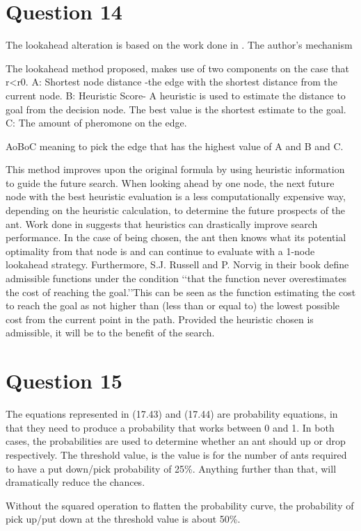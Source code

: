 \documentclass[12pt]{article}
\begin{document}
\section{Question 14}
The lookahead alteration is based on the work done in \cite{Gagn2001ALA}. The author's mechanism

The lookahead method proposed, makes use of two components on the case that r<r0. 
A: Shortest node distance -the edge with the shortest distance from the current node.
B: Heuristic Score- A heuristic is used to estimate the distance to goal from the decision node. The best value is the shortest estimate to the goal.
C: The amount of pheromone on the edge.

AoBoC meaning to pick the edge that has the highest value of A and B and C.

This method improves upon the original formula by using heuristic information to guide the future search. When looking ahead by one node, the next future node with the best heuristic evaluation is a less computationally expensive way, depending on the heuristic calculation, to determine the future prospects of the ant. Work done in \cite{scholvin89} suggests that heuristics can drastically improve search performance.
In the case of being chosen, the ant then knows what its potential optimality from that node is and can continue to evaluate with a 1-node lookahead strategy. Furthermore, S.J. Russell and P. Norvig in their book \cite{russell02} define admissible functions under the condition \lq\lq that the function never overestimates the cost of reaching the goal.\rq\rq This can be seen as the function estimating the cost to reach the goal as not higher than (less than or equal to) the lowest possible cost from the current point in the path. Provided the heuristic chosen is admissible, it will be to the benefit of the search.
\section{Question 15}
The equations represented in (17.43) and (17.44) are probability equations, in that they need to produce a probability that works between 0 and 1. In both cases, the probabilities are used to determine whether an ant should up or drop respectively. 
The threshold value, is the value is for the number of ants required to have a put down/pick probability of 25\%. Anything further than that, will dramatically reduce the chances. 

Without the squared operation to flatten the probability curve, the probability of pick up/put down at the threshold value is about 50\%.
\end{document}
